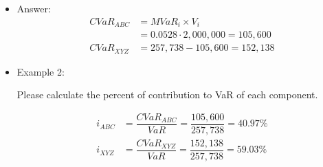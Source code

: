 \begin{itemize}
\begin{itemize}
    There is a portfolio which is made up of two assets, stock ABC and stock XYZ. Assume the portfolio is valued at \$3 million (Stock ABC \$2million, stock XYZ \$1milion) and the 95\% VaR of the portfolio is \$257,738. Marginal VaR of stock ABC is 0.0528. Please calculate the Component VaR of stock XYZ.
    \item Answer:
    \begin{align*}
         CVaR_{ABC} &= MVaR_i \times V_i \\
        &= 0.0528 \cdot 2,000,000 = 105,600 \\
        CVaR_{XYZ} &= 257,738 - 105,600 = 152,138
        \end{align*}
    \item Example 2:
    
    Please calculate the percent of contribution to VaR of each component.

    \begin{align*}
        i_{ABC} &= \dfrac{CVaR_{ABC}}{VaR} = \dfrac{105,600}{257,738} = 40.97\% \\
        i_{XYZ} &= \dfrac{CVaR_{XYZ}}{VaR} = \dfrac{152,138}{257,738} = 59.03\%
        \end{align*}
    \end{itemize}
\end{itemize}




